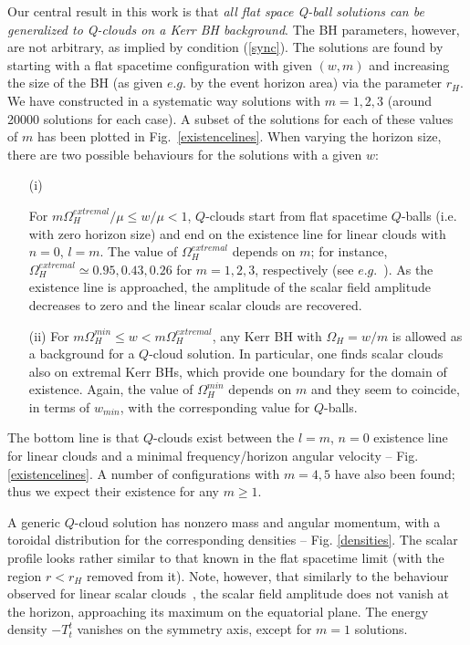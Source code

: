   
Our central result in this work is
that {\it all flat space Q-ball solutions can be generalized to Q-clouds on a Kerr BH background}.
The BH parameters, however, are not arbitrary, as implied by condition (\ref{sync}).
%
%
The solutions are found by starting with a flat spacetime
configuration with given $(w,m)$ and increasing the size of the BH
(as given $e.g.$ by the event horizon area)
via the parameter $r_H$.  
We have constructed in a systematic way solutions with $m=1,2,3$ (around 20000 solutions for each case). A subset of the solutions for each of these values of $m$ has been plotted in Fig.~\ref{existencelines}.  When varying the horizon size, there are two 
possible behaviours for the solutions with a given $w$: 
\begin{itemize}
\item[(i)]

For $m\Omega_H^{extremal}/\mu\leq w/\mu <1$,  $Q$-clouds start from flat spacetime $Q$-balls (i.e. with zero horizon size)
 and end on the existence line for linear clouds with $n=0$, $l=m$. The value of $\Omega_H^{extremal}$ depends on $m$; for instance,  $\Omega_H^{extremal}\simeq 0.95,0.43,0.26$  for $m=1,2,3$, respectively (see $e.g.$~\cite{Hod:2013zza}). As the existence line is approached,
the amplitude of the scalar field amplitude 
decreases to zero and 
the linear scalar clouds are recovered.
 
\item[(ii)]
For  $m\Omega_H^{min}\leq w <m\Omega_H^{extremal}$,
any Kerr BH with $\Omega_H=w/m$ is allowed as a background for a $Q$-cloud solution.
In particular, one finds scalar clouds also on extremal Kerr BHs,
which provide one boundary for the domain of existence. Again, the value of $\Omega_H^{min}$ depends on $m$ and they seem to coincide, in terms of $w_{min}$, with the corresponding value for $Q$-balls.
%

\end{itemize}
%
The bottom line is that $Q$-clouds exist between the $l=m$, $n=0$ existence line for linear clouds and a minimal frequency/horizon angular velocity -- Fig. \ref{existencelines}. A number of configurations with $m=4,5$
have also been found;
thus we expect their existence for any $m\geq 1$.

A generic $Q$-cloud solution has nonzero mass and angular momentum,
with a toroidal distribution for the corresponding densities -- Fig. \ref{densities}.
% 
The scalar profile looks rather similar to that known in the flat spacetime limit
(with the region $r<r_H$ removed from it).
Note, however, that similarly to the behaviour observed for linear scalar clouds~\cite{Benone:2014ssa}, 
the scalar field amplitude does not vanish at the horizon,
approaching its maximum on the equatorial plane.
The energy density $-T_t^t$
vanishes on the symmetry axis, except for $m=1$ solutions.


